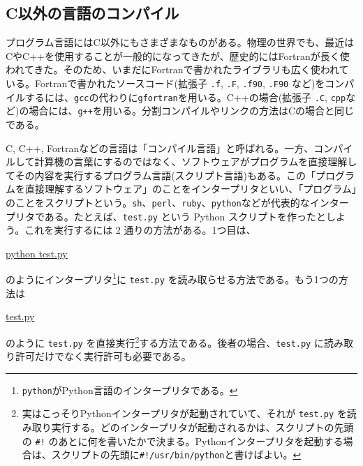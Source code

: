 \subsection{C以外の言語のコンパイル}

プログラム言語にはC以外にもさまざまなものがある。物理の世界でも、最近はCやC++を使用することが一般的になってきたが、歴史的にはFortranが長く使われてきた。そのため、いまだにFortranで書かれたライブラリも広く使われている。Fortranで書かれたソースコード(拡張子 {\tt .f}, {\tt .F}, {\tt .f90}, {\tt .F90} など)をコンパイルするには、{\tt gcc}の代わりに{\tt gfortran}を用いる。C++の場合(拡張子 {\tt .C}, {\tt cpp}など)の場合には、{\tt g++}を用いる。分割コンパイルやリンクの方法はCの場合と同じである。

C, C++, Fortranなどの言語は「コンパイル言語」と呼ばれる。一方、コンパイルして計算機の言葉にするのではなく、ソフトウェアがプログラムを直接理解してその内容を実行するプログラム言語(スクリプト言語)もある。この「プログラムを直接理解するソフトウェア」のことをインタープリタといい、「プログラム」のことをスクリプトという。{\tt sh}、{\tt perl}、{\tt ruby}、{\tt python}などが代表的なインタープリタである。たとえば、{\tt test.py} という Python スクリプトを作ったとしよう。これを実行するには 2 通りの方法がある。1つ目は、
\begin{commandline2}
\prompt \underline{python test.py}
\end{commandline2} \noindent
のようにインタープリタ\footnote{{\tt python}がPython言語のインタープリタである。}に {\tt test.py} を読み取らせる方法である。もう1つの方法は
\begin{commandline2}
\prompt \underline{test.py}
\end{commandline2} \noindent
のように {\tt test.py} を直接実行\footnote{実はこっそりPythonインタープリタが起動されていて、それが {\tt test.py} を読み取り実行する。どのインタープリタが起動されるかは、スクリプトの先頭の {\tt \#!} のあとに何を書いたかで決まる。Pythonインタープリタを起動する場合は、スクリプトの先頭に{\tt \#!/usr/bin/python}と書けばよい。}する方法である。後者の場合、{\tt test.py} に読み取り許可だけでなく実行許可も必要である。

